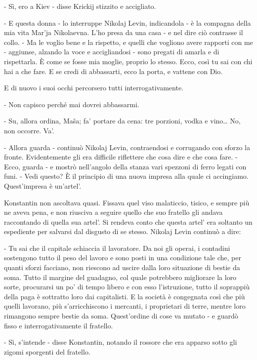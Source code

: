 - Sì, ero a Kiev - disse Krickij stizzito e accigliato. 

- E questa donna - lo interruppe Nikolaj Levin, indicandola - è la compagna della mia vita Mar'ja Nikolaevna. L'ho presa da una casa - e nel dire ciò contrasse il collo. - Ma le voglio bene e la rispetto, e quelli che vogliono avere rapporti con me - aggiunse, alzando la voce e accigliandosi - sono pregati di amarla e di rispettarla. È come se fosse mia moglie, proprio lo stesso. Ecco, così tu sai con chi hai a che fare. E se credi di abbassarti, ecco la porta, e vattene con Dio. 

E di nuovo i suoi occhi percorsero tutti interrogativamente. 

- Non capisco perché mai dovrei abbassarmi. 

- Su, allora ordina, Maša; fa' portare da cena: tre porzioni, vodka e vino\ldots{} No, non occorre. Va'. 

\label{xxv} 

- Allora guarda - continuò Nikolaj Levin, contraendosi e corrugando con sforzo la fronte. Evidentemente gli era difficile riflettere che cosa dire e che cosa fare. - Ecco, guarda - e mostrò nell'angolo della stanza vari spezzoni di ferro legati con funi. - Vedi questo? È il principio di una nuova impresa alla quale ci accingiamo. Quest'impresa è un'artel'. 

Konstantin non ascoltava quasi. Fissava quel viso malaticcio, tisico, e sempre più ne aveva pena, e non riusciva a seguire quello che suo fratello gli andava raccontando di quella sua artel'. Si rendeva conto che questa artel' era soltanto un espediente per salvarsi dal disgusto di se stesso. Nikolaj Levin continuò a dire: 

- Tu sai che il capitale schiaccia il lavoratore. Da noi gli operai, i contadini sostengono tutto il peso del lavoro e sono posti in una condizione tale che, per quanti sforzi facciano, non riescono ad uscire dalla loro situazione di bestie da soma. Tutto il margine del guadagno, col quale potrebbero migliorare la loro sorte, procurarsi un po' di tempo libero e con esso l'istruzione, tutto il soprappiù della paga è sottratto loro dai capitalisti. E la società è congegnata così che più quelli lavorano, più s'arricchiscono i mercanti, i proprietari di terre, mentre loro rimangono sempre bestie da soma. Quest'ordine di cose va mutato - e guardò fisso e interrogativamente il fratello. 

- Sì, s'intende - disse Konstantin, notando il rossore che era apparso sotto gli zigomi sporgenti del fratello. 

